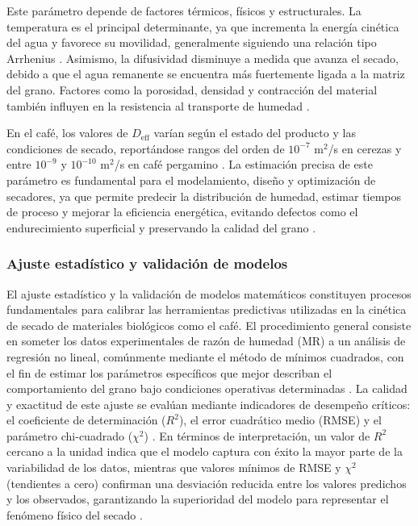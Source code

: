 Este parámetro depende de factores térmicos, físicos y estructurales. La temperatura es el principal determinante, ya que incrementa la energía cinética del agua y favorece su movilidad, generalmente siguiendo una relación tipo Arrhenius \parencite{liu_optimization_2025, fernando_effect_2025}. Asimismo, la difusividad disminuye a medida que avanza el secado, debido a que el agua remanente se encuentra más fuertemente ligada a la matriz del grano. Factores como la porosidad, densidad y contracción del material también influyen en la resistencia al transporte de humedad \parencite{alves_physiological_2017, abdissa_harmonizing_2023}.

En el café, los valores de $D_{\text{eff}}$ varían según el estado del producto y las condiciones de secado, reportándose rangos del orden de $10^{-7}$ m$^2$/s en cerezas y entre $10^{-9}$ y $10^{-10}$ m$^2$/s en café pergamino \parencite{fernando_effect_2025, phitakwinai_thinlayer_2019}. La estimación precisa de este parámetro es fundamental para el modelamiento, diseño y optimización de secadores, ya que permite predecir la distribución de humedad, estimar tiempos de proceso y mejorar la eficiencia energética, evitando defectos como el endurecimiento superficial y preservando la calidad del grano \parencite{khan_determination_2017, cruz-ospina_improving_2026}.

\subsubsection{Ajuste estadístico y validación de modelos}

El ajuste estadístico y la validación de modelos matemáticos constituyen procesos fundamentales para calibrar las herramientas predictivas utilizadas en la cinética de secado de materiales biológicos como el café. El procedimiento general consiste en someter los datos experimentales de razón de humedad (MR) a un análisis de regresión no lineal, comúnmente mediante el método de mínimos cuadrados, con el fin de estimar los parámetros específicos que mejor describan el comportamiento del grano bajo condiciones operativas determinadas \parencite{fernando_effect_2025, guemouni_convective_2022, p_romero_leiton_mathematical_2025, phitakwinai_thinlayer_2019}. La calidad y exactitud de este ajuste se evalúan mediante indicadores de desempeño críticos: el coeficiente de determinación ($R^2$), el error cuadrático medio (RMSE) y el parámetro chi-cuadrado ($\chi^2$) \parencite{guemouni_convective_2022, abdissa_harmonizing_2023, cansee_effect_2026, meng_study_2023}. En términos de interpretación, un valor de $R^2$ cercano a la unidad indica que el modelo captura con éxito la mayor parte de la variabilidad de los datos, mientras que valores mínimos de RMSE y $\chi^2$ (tendientes a cero) confirman una desviación reducida entre los valores predichos y los observados, garantizando la superioridad del modelo para representar el fenómeno físico del secado \parencite{phitakwinai_thinlayer_2019, fernando_effect_2025, guemouni_convective_2022, p_romero_leiton_mathematical_2025}.

